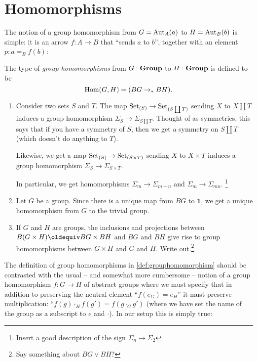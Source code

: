 \section{Homomorphisms}
\label{sec:homomorphisms}


The notion of a group homomorphism from $G=\mathrm{Aut}_A(a)$ to $H=\mathrm{Aut}_B(b)$ is simple: it is an arrow $f:A\to B$ that ``sends $a$ to $b$'', \ie together with an element $p:a=_Bf(b)$:
\begin{definition}\label{def:grouphomomorphism}
  The type of \emph{group homomorphisms} from $G:\mathbf{Group}$ to $H:\mathbf{Group}$ is defined to be
$$\Hom(G,H)=(BG\to_* BH).%
$$
\end{definition}
\begin{example}
  \begin{enumerate}
  \item   Consider two sets $S$ and $T$.  The map $\mathord{\mathrm{Set}}_{(S)}\to\mathord{\mathrm{Set}}_{(S\coprod T)}$ sending $X$ to $X\coprod T$ induces a group homomorphism $\Sigma_S\to\Sigma_{S\coprod T}$.
Thought of as symmetries, this says that if you have a symmetry of $S$, then we get a symmetry on $S\coprod T$ (which doesn't do anything to $T$).  

Likewise, we get a map $\mathord{\mathrm{Set}}_{(S)}\to\mathord{\mathrm{Set}}_{(S\times T)}$ sending $X$ to $X\times T$ induces a group homomorphism $\Sigma_S\to\Sigma_{S\times T}$. 

In particular, we get homomorphisms $\Sigma_m\to\Sigma_{m+n}$ and $\Sigma_m\to\Sigma_{mn}$. \footnote{Insert a good description of the sign $\Sigma_n\to\Sigma_2$}
\item Let $G$ be a group.  Since there is a unique map from $BG$ to $\mathbf 1$, we get a unique homomorphism from $G$ to the trivial group. 
\item If $G$ and $H$ are groups, the inclusions and projections between $B(G\times H)\oldequiv BG\times BH$ and $BG$ and $BH$ give rise to group homomorphisms between $G\times H$ and $G$ and $H$.  Write out.\footnote{Say something about $BG\vee BH$?}
  \end{enumerate}

\end{example}

The definition of group homomorphisms in \cref{def:grouphomomorphism} should be contrasted with the usual -- and somewhat more cumbersome -- notion of a group homomorphism $f\colon G\to H$ of abstract groups where we must specify that in addition to preserving the neutral element ``$f(e_G)=e_H$'' it must preserve multiplication: ``$f(g)\cdot_H f(g')=f(g\cdot_G g')$ (where we have set the name of the group as a subscript to $e$ and $\cdot$).  In our setup this is simply true:

